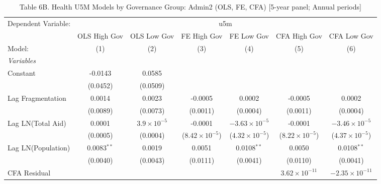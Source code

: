 
\begin{table}[H]
   \caption{Table 6B. Health U5M Models by Governance Group: Admin2 (OLS, FE, CFA) [5-year panel; Annual periods]}
   \centering
   \begin{tabular}{lcccccc}
      \tabularnewline \midrule \midrule
      Dependent Variable: & \multicolumn{6}{c}{u5m}\\
                         & OLS High Gov  & OLS Low Gov          & FE High Gov             & FE Low Gov              & CFA High Gov             & CFA Low Gov \\   
      Model:             & (1)           & (2)                  & (3)                     & (4)                     & (5)                      & (6)\\  
      \midrule
      \emph{Variables}\\
      Constant           & -0.0143       & 0.0585               &                         &                         &                          &   \\   
                         & (0.0452)      & (0.0509)             &                         &                         &                          &   \\   
      Lag Fragmentation  & 0.0014        & 0.0023               & -0.0005                 & 0.0002                  & -0.0005                  & 0.0002\\   
                         & (0.0089)      & (0.0073)             & (0.0011)                & (0.0004)                & (0.0011)                 & (0.0004)\\   
      Lag LN(Total Aid)  & 0.0001        & $3.9\times 10^{-5}$  & -0.0001                 & $-3.63\times 10^{-5}$   & -0.0001                  & $-3.46\times 10^{-5}$\\    
                         & (0.0005)      & (0.0004)             & ($8.42\times 10^{-5}$)  & ($4.32\times 10^{-5}$)  & ($8.22\times 10^{-5}$)   & ($4.37\times 10^{-5}$)\\    
      Lag LN(Population) & 0.0083$^{**}$ & 0.0019               & 0.0051                  & 0.0108$^{**}$           & 0.0050                   & 0.0108$^{**}$\\   
                         & (0.0040)      & (0.0043)             & (0.0111)                & (0.0041)                & (0.0110)                 & (0.0041)\\   
      CFA Residual       &               &                      &                         &                         & $3.62\times 10^{-11}$    & $-2.35\times 10^{-11}$\\    

\end{tabular}
\end{table}
